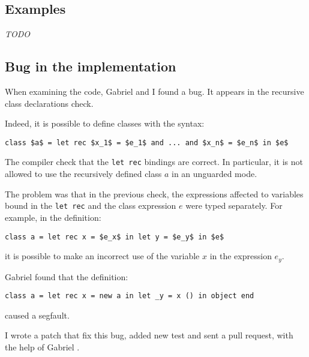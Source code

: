 \documentclass{article}
\begin{document}
\subsection{Examples}
\textit{TODO}

\subsection{Bug in the implementation}
When examining the code, Gabriel and I found a bug. It appears in the recursive
class declarations check.

Indeed, it is possible to define classes with the syntax:
\begin{lstlisting}[mathescape=true]
class $a$ = let rec $x_1$ = $e_1$ and ... and $x_n$ = $e_n$ in $e$
\end{lstlisting}
The compiler check that the \lstinline|let rec| bindings are correct. In
particular, it is not allowed to use the recursively defined class $a$ in an
unguarded mode.

%

The problem was that in the previous check, the expressions affected to
variables bound in the \lstinline|let rec| and the class expression $e$ were
typed separately. For example, in the definition:
\begin{lstlisting}[mathescape=true]
class a = let rec x = $e_x$ in let y = $e_y$ in $e$
\end{lstlisting}
it is possible to make an incorrect use of the variable $x$ in the expression
$e_y$.

Gabriel found that the definition:
\begin{lstlisting}
class a = let rec x = new a in let _y = x () in object end
\end{lstlisting}
caused a segfault.

I wrote a patch that fix this bug, added new test and sent a pull request,
with the help of Gabriel \cite{PullRequest}.

\end{document}
